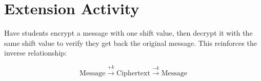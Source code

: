 \documentclass[12pt]{article}
\begin{document}
\vspace{0.5cm}

\section*{Extension Activity}

Have students encrypt a message with one shift value, then decrypt it with the same shift value to verify they get back the original message. This reinforces the inverse relationship:

$$\text{Message} \xrightarrow{+k} \text{Ciphertext} \xrightarrow{-k} \text{Message}$$
\end{document}
